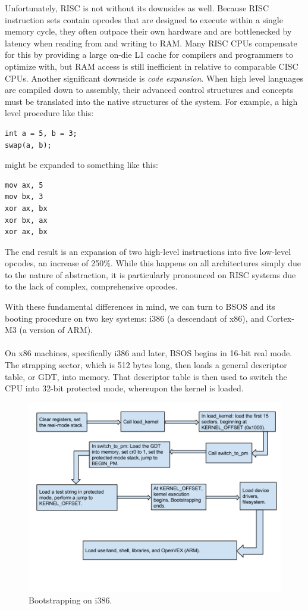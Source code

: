 \documentclass[english]{paper}
\begin{document}
Unfortunately, RISC is not without its downsides as well. Because RISC instruction sets contain opcodes that are designed to execute within a single memory cycle, they often outpace their own hardware and are bottlenecked by latency when reading from and writing to RAM. Many RISC CPUs compensate for this by providing a large on-die L1 cache for compilers and programmers to optimize with, but RAM access is still inefficient in relative to comparable CISC CPUs. Another significant downside is \textit{code expansion}. When high level languages are compiled down to assembly, their advanced control structures and concepts must be translated into the native structures of the system. For example, a high level procedure like this:
\begin{lstlisting}
int a = 5, b = 3;
swap(a, b);
\end{lstlisting}
might be expanded to something like this:
\begin{lstlisting}
mov ax, 5
mov bx, 3
xor ax, bx
xor bx, ax
xor ax, bx
\end{lstlisting}
The end result is an expansion of two high-level instructions into five low-level opcodes, an increase of 250\%. While this happens on all architectures simply due to the nature of abstraction, it is particularly pronounced on RISC systems due to the lack of complex, comprehensive opcodes.

With these fundamental differences in mind, we can turn to BSOS and its booting procedure on two key systems: i386 (a descendant of x86), and Cortex-M3 (a version of ARM).

\paragraph{}
On x86 machines, specifically i386 and later, BSOS begins in 16-bit real mode. The strapping sector, which is 512 bytes long, then loads a general descriptor table, or GDT, into memory. That descriptor table is then used to switch the CPU into 32-bit protected mode, whereupon the kernel is loaded.
\begin{figure}[h!]
\centerline{\includegraphics[scale=0.4]{imgs/boot_x86.png}}
\caption{Bootstrapping on i386.}
\end{figure}
\end{document}
